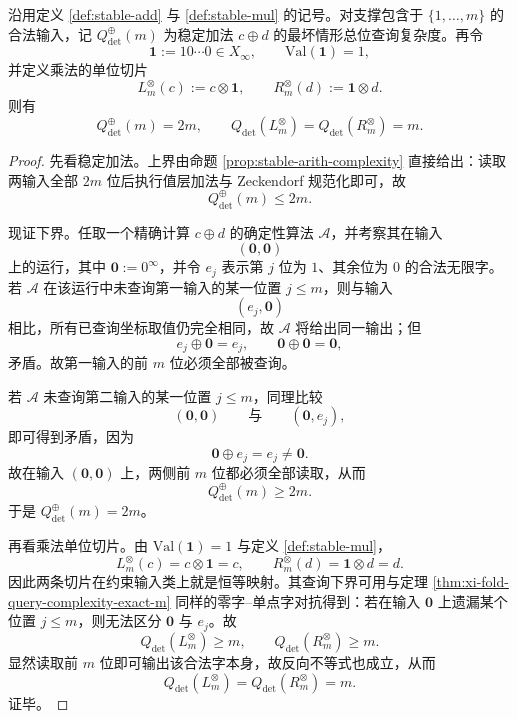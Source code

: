 \begin{corollary}[稳定加法的全输入查询饱和与稳定乘法单位切片的满查询刚性]\label{cor:xi-stable-add-query-saturation-mul-unit-slice}
沿用定义 \ref{def:stable-add} 与 \ref{def:stable-mul} 的记号。对支撑包含于 \(\{1,\dots,m\}\) 的合法输入，记 \(Q_{\det}^{\oplus}(m)\) 为稳定加法 \(c\oplus d\) 的最坏情形总位查询复杂度。再令
\[
\mathbf1:=10\cdots0\in X_\infty,
\qquad
\mathrm{Val}(\mathbf1)=1,
\]
并定义乘法的单位切片
\[
L_m^{\otimes}(c):=c\otimes \mathbf1,
\qquad
R_m^{\otimes}(d):=\mathbf1\otimes d.
\]
则有
\[
\boxed{\;
Q_{\det}^{\oplus}(m)=2m,\qquad
Q_{\det}(L_m^{\otimes})=Q_{\det}(R_m^{\otimes})=m.\;}
\]
\end{corollary}
\begin{proof}
先看稳定加法。上界由命题 \ref{prop:stable-arith-complexity} 直接给出：读取两输入全部 \(2m\) 位后执行值层加法与 Zeckendorf 规范化即可，故
\[
Q_{\det}^{\oplus}(m)\le 2m.
\]

现证下界。任取一个精确计算 \(c\oplus d\) 的确定性算法 \(\mathcal A\)，并考察其在输入
\[
(\mathbf0,\mathbf0)
\]
上的运行，其中 \(\mathbf0:=0^\infty\)，并令 \(e_j\) 表示第 \(j\) 位为 \(1\)、其余位为 \(0\) 的合法无限字。若 \(\mathcal A\) 在该运行中未查询第一输入的某一位置 \(j\le m\)，则与输入
\[
(e_j,\mathbf0)
\]
相比，所有已查询坐标取值仍完全相同，故 \(\mathcal A\) 将给出同一输出；但
\[
e_j\oplus \mathbf0=e_j,
\qquad
\mathbf0\oplus \mathbf0=\mathbf0,
\]
矛盾。故第一输入的前 \(m\) 位必须全部被查询。

若 \(\mathcal A\) 未查询第二输入的某一位置 \(j\le m\)，同理比较
\[
(\mathbf0,\mathbf0)
\qquad\text{与}\qquad
(\mathbf0,e_j),
\]
即可得到矛盾，因为
\[
\mathbf0\oplus e_j=e_j
\neq
\mathbf0.
\]
故在输入 \((\mathbf0,\mathbf0)\) 上，两侧前 \(m\) 位都必须全部读取，从而
\[
Q_{\det}^{\oplus}(m)\ge 2m.
\]
于是 \(Q_{\det}^{\oplus}(m)=2m\)。

再看乘法单位切片。由 \(\mathrm{Val}(\mathbf1)=1\) 与定义 \ref{def:stable-mul}，
\[
L_m^{\otimes}(c)=c\otimes\mathbf1=c,
\qquad
R_m^{\otimes}(d)=\mathbf1\otimes d=d.
\]
因此两条切片在约束输入类上就是恒等映射。其查询下界可用与定理 \ref{thm:xi-fold-query-complexity-exact-m} 同样的零字--单点字对抗得到：若在输入 \(\mathbf0\) 上遗漏某个位置 \(j\le m\)，则无法区分 \(\mathbf0\) 与 \(e_j\)。故
\[
Q_{\det}(L_m^{\otimes})\ge m,
\qquad
Q_{\det}(R_m^{\otimes})\ge m.
\]
显然读取前 \(m\) 位即可输出该合法字本身，故反向不等式也成立，从而
\[
Q_{\det}(L_m^{\otimes})=Q_{\det}(R_m^{\otimes})=m.
\]
证毕。
\end{proof}

